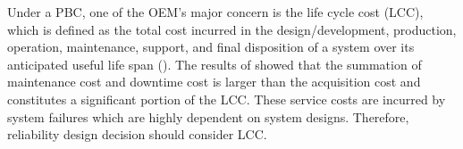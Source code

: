 \documentclass[preprint,12pt]{elsarticle}
\begin{document}



Under a PBC, one of the OEM's major concern is the life cycle cost (LCC), which is defined as the total cost incurred in the design/development, production, operation, maintenance, support, and final disposition of a system over its anticipated useful life span (\citet{Barringer}). The results of \citet{Oner2007} showed that the summation of maintenance cost and downtime cost is larger than the acquisition cost and constitutes a significant portion of the LCC. These service costs are incurred by system failures which are highly dependent on system designs. Therefore, reliability design decision should consider LCC.
\end{document}
